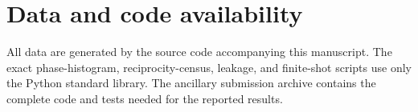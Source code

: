\documentclass[aps,pra,reprint,amsmath,amssymb,superscriptaddress,longbibliography]{revtex4-2}
\begin{document}
\section*{Data and code availability}

All data are generated by the source code accompanying this manuscript.
The exact phase-histogram, reciprocity-census, leakage, and finite-shot
scripts use only the Python standard library.  The ancillary submission
archive contains the complete code and tests needed for the reported results.


\end{document}

